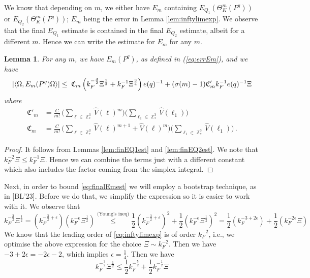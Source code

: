 \documentclass[sn-mathphys, Numbered ,a4paper]{sn-jnl}%
\DeclareMathOperator{\Z}{\mathbb{Z}}
\newcommand{\half}{\frac{1}{2}}
\newcommand{\eva}[1]{\left\langle #1 \right\rangle}
\theoremstyle{plain}
\newtheorem{lemma}[theorem]{Lemma}
\theoremstyle{definition}
\theoremstyle{remark}
\theoremstyle{plain}
\theoremstyle{definition}
\theoremstyle{remark}
\begin{document}
We know that depending on $m$, we either have $E_m $ containing $ E_{Q_1}(\Theta^m_K(P^q))$ or $E_{Q_2}(\Theta^m_K(P^q))$; $E_m$ being the error in Lemma \ref{lem:inftylimexp}. We observe that the final $E_{Q_1}$ estimate is contained in the final $E_{Q_2}$ estimate, albeit for a different $m$. Hence we can write the estimate for $E_m$ for any $m$. 
\begin{lemma}
	For any $m$, we have $E_m(P^q)$, as defined in (\ref{eq:errEm}), and we have
	\begin{equation}
		\abs{\eva{\Omega, E_m(P^q) \Omega}} \leq \; \mathfrak{C}_m\left( k_{F}^{-\frac{3}{2}} \Xi^\half
		+ k_{F}^{-1}\Xi^{\frac{3}{4}} \right)e(q)^{-1}+ (\sigma(m)-1)\mathfrak{C}'_m k_{F}^{-1} e(q)^{-1} \Xi \label{eq:finalEmest}
	\end{equation}
where
\begin{align}
	\mathfrak{C}'_m&= \frac{C}{m!}\,  \Bigg(\sum\limits_{\ell \in \Z^3_*} \hat{V}(\ell)^m\Bigg)\Bigg( \sum\limits_{\ell_1 \in \Z^3_*} \hat{V}(\ell_1) \Bigg)\nonumber\\
	\mathfrak{C}_m&= \frac{C}{m!}\,  \Bigg(\sum\limits_{\ell \in \Z^3_*} \hat{V}(\ell)^{m+1}+\hat{V}(\ell)^m\Bigg)\Bigg( \sum\limits_{\ell_1 \in \Z^3_*} \hat{V}(\ell_1) \Bigg)\,.\nonumber
\end{align}
\end{lemma}
\begin{proof}
	It follows from Lemmas \ref{lem:finEQ1est} and \ref{lem:finEQ2est}. We note that  $k_F^{-2}\Xi\leq k_F^{-1}\Xi$. Hence we can combine the terms just with a different constant which also includes the factor coming from the simplex integral.
\end{proof}
Next, in order to bound \eqref{eq:finalEmest} we will employ a bootstrap technique, as in [BL'23]. Before we do that, we simplify the expression so it is easier to work with it.
We observe that 
\begin{equation}
	k_{F}^{-\frac{3}{2}} \Xi^\half = (k_{F}^{-\frac{3}{2} +\epsilon} ) (k_{F}^{-\epsilon} \Xi^\half) \stackrel{\text{(Young's ineq)} }{\leq} \half(k_{F}^{-\frac{3}{2} +\epsilon} )^2 + \half(k_{F}^{-\epsilon} \Xi^\half)^2 = \half(k_{F}^{-3 +2\epsilon}) + \half(k_{F}^{-2\epsilon} \Xi)
\end{equation}
We know that the leading order of \eqref{eq:inftylimexp} is of order $k_F^{-2}$, i.e., we optimise the above expression for the choice $\Xi \sim k_F^{-2}$. Then we have $-3 +2\epsilon = -2\epsilon -2 $, which implies $\epsilon =\frac{1}{4}$. 
Then we have  
\begin{equation} \label{eq:kfholder1}
	k_{F}^{-\frac{3}{2}} \Xi^\half \leq \half k_{F}^{-\frac{5}{2}} + \half k_{F}^{-\half} \Xi
\end{equation}
\end{document}
